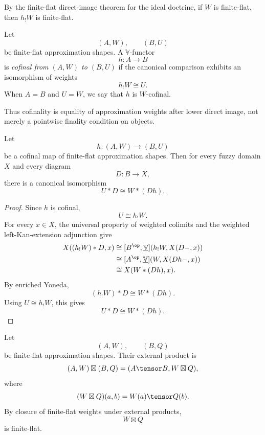 By the finite-flat direct-image theorem for the ideal doctrine, if \(W\) is
finite-flat, then \(h_!W\) is finite-flat.

\begin{definition}
\label{def:cofinal-map-approximation-shapes}
Let
\[
    (A,W),
    \qquad
    (B,U)
\]
be finite-flat approximation shapes.  A \(\mathbb V\)-functor
\[
    h:A\to B
\]
is \emph{cofinal from \((A,W)\) to \((B,U)\)} if the canonical comparison
exhibits an isomorphism of weights
\[
    h_!W\cong U.
\]
When \(A=B\) and \(U=W\), we say that \(h\) is \(W\)-cofinal.
\end{definition}

Thus cofinality is equality of approximation weights after lower direct image,
not merely a pointwise finality condition on objects.

\begin{proposition}
\label{prop:finite-flat-cofinality}
Let
\[
    h:(A,W)\to(B,U)
\]
be a cofinal map of finite-flat approximation shapes.  Then for every fuzzy
domain \(X\) and every diagram
\[
    D:B\to X,
\]
there is a canonical isomorphism
\[
    U*D
    \cong
    W*(Dh).
\]
\end{proposition}

\begin{proof}
Since \(h\) is cofinal,
\[
    U\cong h_!W.
\]
For every \(x\in X\), the universal property of weighted colimits and the
weighted left-Kan-extension adjunction give
\[
\begin{aligned}
    X((h_!W)*D,x)
    &\cong
    [B^{\op},\underline{\mathbb V}]
    (h_!W,X(D-,x))
    \\
    &\cong
    [A^{\op},\underline{\mathbb V}]
    (W,X(Dh-,x))
    \\
    &\cong
    X(W*(Dh),x).
\end{aligned}
\]
By enriched Yoneda,
\[
    (h_!W)*D\cong W*(Dh).
\]
Using \(U\cong h_!W\), this gives
\[
    U*D\cong W*(Dh).
\]
\end{proof}

\begin{definition}
\label{def:external-product-approximation-shapes-rde}
Let
\[
    (A,W),
    \qquad
    (B,Q)
\]
be finite-flat approximation shapes.  Their external product is
\[
    (A,W)\boxtimes(B,Q)
    =
    (A\tensor B,W\boxtimes Q),
\]
where
\[
    (W\boxtimes Q)(a,b)
    =
    W(a)\tensor Q(b).
\]
By closure of finite-flat weights under external products,
\[
    W\boxtimes Q
\]
is finite-flat.
\end{definition}

